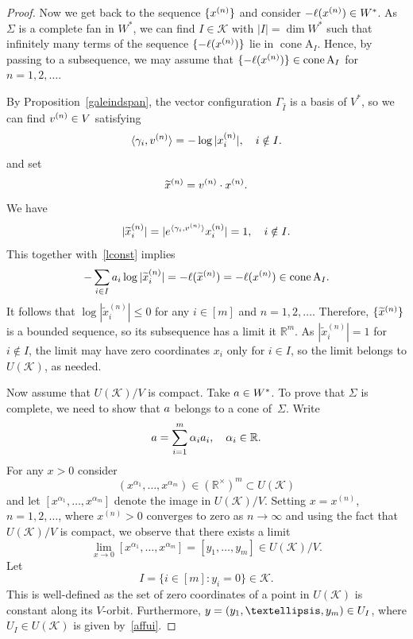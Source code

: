 \documentclass[10pt,a4paper]{amsart}
\def\R{\mathbb R}
\def\cone{\mathop{\mathrm{cone}}}
\def\sK{\mathcal K}
\newcommand{\mb}[1]{{\textbf {\textit#1}}}
\renewcommand{\le}{\leqslant}
\begin{document}
\begin{proof}
Now we get back to the sequence $\{\mb x^{(n)}\}$ and consider $-\ell(\mb x^{(n)})\in W^*$. As $\Sigma$ is a complete fan in $W^*$, we can find $I\in\sK$ with $|I|=\dim W^*$ such that infinitely many terms of the sequence $\{-\ell(\mb x^{(n)})\}$ lie in $\cone\mathrm A_I$. Hence, by passing to a subsequence, we may assume that
$\{-\ell(\mb x^{(n)})\}\in\cone\mathrm A_I$ for $n=1,2,\ldots$.

By Proposition~\ref{galeindspan}, the vector configuration $\Gamma_{\widehat I}$ is a basis of $V^*$, so we can find $\mb v^{(n)}\in V$ satisfying
$$
   \langle \gamma_i ,\mb v^{(n)}\rangle = -\log|x_{i}^{(n)}|,\quad i \notin I.
$$
and set
\[
  \widetilde{\mb x}^{(n)}=\mb v^{(n)}\cdot{\mb x}^{(n)}.
\]
We have
\[
  |\widetilde x_i^{(n)}| = |e^{\langle \gamma_i,\mb v^{(n)}\rangle} x_i^{(n)}|=1,\quad i\notin I.
\]
This together with~\eqref{lconst} implies
\[
-\sum\limits_{i \in I}\mb a_i \log |\widetilde x_i^{(n)}| =-\ell(\widetilde{\mb x}^{(n)})=  -\ell(\mb x^{(n)}) \in \cone\mathrm A_I.
\]
It follows that $\log |\widetilde x_i^{(n)}|\le0$ for any $i\in[m]$ and $n=1,2,\ldots$. Therefore, 
$\{\widetilde{\mb x}^{(n)}\}$ is a bounded sequence, so its subsequence has a limit it $\R^m$. As $|\widetilde x_i^{(n)}|=1$ for $i\notin I$, the limit may have zero coordinates $x_i$ only for $i\in I$, so the limit belongs to $U(\sK)$, as needed.

\smallskip

Now assume that $U(\sK)/V$ is compact. Take $\mb a\in W^*$. To prove that $\Sigma$ is complete, we need to show that $\mb a$ belongs to a cone of~$\Sigma$. Write 
\begin{equation}\label{aalpha}
  \mb a=\sum_{i=1}^m\alpha_i\mb a_i, \quad \alpha_i\in\R.
\end{equation}
For any $x>0$ consider
\[
  (x^{\alpha_1},\ldots,x^{\alpha_m})\in (\R^\times)^m\subset U(\sK)
\]
and let $[x^{\alpha_1},\ldots,x^{\alpha_m}]$ denote the image in $U(\sK)/V$. Setting $x=x^{(n)}$, $n=1,2,\ldots$, where $x^{(n)}>0$ converges to zero as $n\to\infty$ and using the fact that $U(\sK)/V$ is compact, we observe that there exists a limit
\[
  \lim_{x\to0}[x^{\alpha_1},\ldots,x^{\alpha_m}]=[y_1,\ldots,y_m]\in U(\sK)/V.
\]
Let 
\[
  I=\{i\in[m]\colon y_i=0\}\in\sK.
\]
This is well-defined as the set of zero coordinates of a point in $U(\sK)$ is constant along its $V$-orbit. Furthermore, $\mb y=(y_1,\ldots,y_m)\in U_I$, where $U_I\in U(\sK)$ is given by~\eqref{affui}.


\end{proof}
\end{document}
